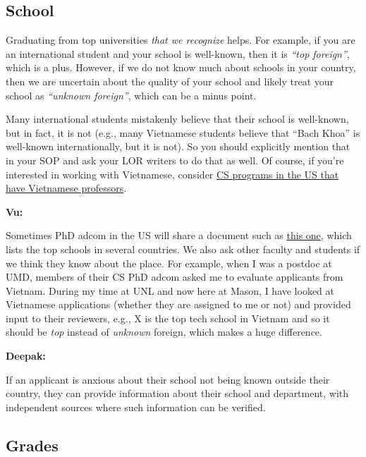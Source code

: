 \documentclass[oneside,11pt,dvipsnames]{book}
\newenvironment{commentbox}[1][]{
  \small
  \begin{mybox}
    {\small \textbf{#1}}
  }{
  \end{mybox}
}
\begin{document}
\subsection{School} Graduating from top universities \emph{that we recognize} helps. For example, if you are an international student and your school is well-known, then it is \emph{``top foreign''}, which is a plus.
However, if we do not know much about schools in your country, then we are uncertain about the quality of your school and likely treat your school as \emph{``unknown foreign''}, which can be a minus point.


Many international students mistakenly believe that their school is well-known, but in fact, it is not (e.g., many Vietnamese students believe that ``Bach Khoa'' is well-known internationally, but it is not).  So you should explicitly mention that in your SOP and ask your LOR writers to do that as well. 
Of course, if you're interested in working with Vietnamese, consider  \href{https://github.com/dynaroars/dynaroars.github.io/wiki/Viet-CS-Profs-US}{CS programs in the US that have Vietnamese professors}. %

\begin{commentbox}[Vu:]
  Sometimes PhD adcom in the US will share a document such as \href{https://github.com/dynaroars/dynaroars.github.io/wiki/Foreign-Top-Schools}{this one}, which lists the top schools in several countries. We also ask other faculty and students if we think they know about the place.  For example, when I was a postdoc at UMD, members of their CS PhD adcom asked me to evaluate applicants from Vietnam.  During my time at UNL and now here at Mason, I have looked at Vietnamese applications (whether they are assigned to me or not) and provided input to their reviewers, e.g., X is the top tech school in Vietnam and so it should be \emph{top} instead of \emph{unknown} foreign, which makes a huge difference.
\end{commentbox}
\begin{commentbox}[Deepak:]
  If an applicant is anxious about their school not being known outside their country, they can provide information about their school and department, with independent sources where such information can be verified.
\end{commentbox}
\subsection{Grades}\label{sec:gpa}
\end{document}
